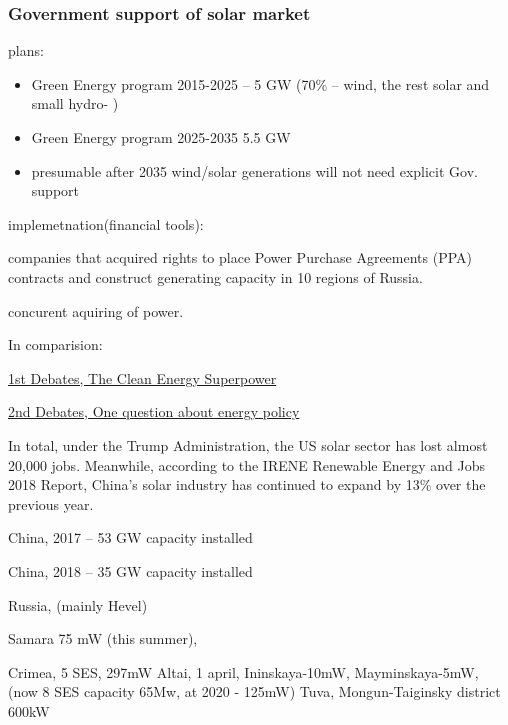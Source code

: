 \documentclass[14pt]{beamer}
\begin{document}
\begin{frame}
	\frametitle{\small Government support of solar market}
	plans:
	\begin{itemize}
		\item Green Energy program 2015-2025  -- 5 GW (70\% -- wind, the rest solar and small hydro- )
		\item Green Energy program	2025-2035  5.5 GW
        	\item presumable after 2035 wind/solar generations  will not need explicit Gov. support 
	\end{itemize}
	implemetnation(financial tools):	

companies that acquired rights to place Power Purchase Agreements (PPA) contracts and construct generating capacity in 10 regions of Russia.

concurent aquiring of power.

\end{frame}


\begin{frame}
In comparision:

	\href{https://www.youtube.com/watch?v=855Am6ovK7s&feature=youtu.be&t=920}{1st Debates, The Clean Energy Superpower}

	\href{https://youtu.be/FRlI2SQ0Ueg?t=4980}{2nd Debates, One question about energy policy}


In total, under the Trump Administration, the US solar sector has lost almost 20,000 jobs. 
Meanwhile, according to the IRENE Renewable Energy and Jobs 2018 Report, 
China’s solar industry has continued to expand by 13\% over the previous year. 
\end{frame}	

\begin{frame}
China, 2017 -- 53 GW capacity installed

China, 2018 -- 35 GW capacity installed

	Russia, (mainly Hevel)

Samara 75 mW (this summer),

Crimea, 5 SES, 297mW
	Altai, 1 april, Ininskaya-10mW, Mayminskaya-5mW, (now 8 SES capacity 65Mw, at 2020 - 125mW)
	Tuva, Mongun-Taiginsky district 600kW %
\end{frame}
\end{document}

